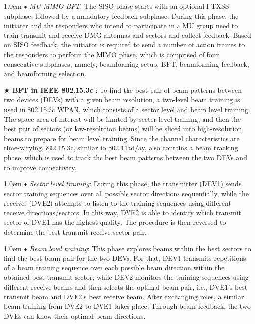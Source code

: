 \documentclass[journal,comsoc]{IEEEtran}
\begin{document}
\hangindent 1.0em
\noindent
$\bullet$ \emph{MU-MIMO BFT}: The SISO phase starts with an optional I-TXSS subphase, followed by a mandatory feedback subphase. During this phase, the initiator and the responders who intend to participate in a MU group need to train transmit and receive DMG antennas and sectors and collect feedback. Based on SISO feedback, the initiator is required to send a number of action frames to the responders to perform the MIMO phase, which is comprised of four consecutive subphases, namely, beamforming setup, BFT, beamforming feedback, and beamforming selection.




$\bigstar$ \textbf{BFT in IEEE 802.15.3c} \cite{IEEE-Std-802.15.3c}: To find the best pair of beam patterns between two devices (DEVs) with a given beam resolution, a two-level beam training is used in 802.15.3c WPAN, which consists of a sector level and beam level training. The space area of interest will be limited by sector level training, and then the best pair of sectors (or low-resolution beams) will be sliced into high-resolution beams to prepare for beam level training. Since the channel characteristics are time-varying, 802.15.3c, similar to 802.11ad/ay, also contains a beam tracking phase, which is used to track the best beam patterns between the two DEVs and to improve connectivity.


\hangindent 1.0em
\noindent
$\bullet$ \emph{Sector level training}: During this phase, the transmitter (DEV1) sends sector training sequences over all possible sector directions sequentially, while the receiver (DVE2) attempts to listen to the training sequences using different receive directions/sectors. In this way, DVE2 is able to identify which transmit sector of DVE1 has the highest quality. The procedure is then reversed to determine the best transmit-receive sector pair.

\hangindent 1.0em
\noindent
$\bullet$ \emph{Beam level training}: This phase explores beams within the best sectors to find the best beam pair for the two DEVs. For that, DEV1 transmits repetitions of a beam training sequence over each possible beam direction within the obtained best transmit sector, while DEV2 monitors the training sequences using different receive beams and then selects the optimal beam pair, i.e., DVE1's best transmit beam and DVE2's best receive beam. After exchanging roles, a similar beam training from DVE2 to DVE1 takes place. Through beam feedback, the two DVEs can know their optimal beam directions.
\end{document}
